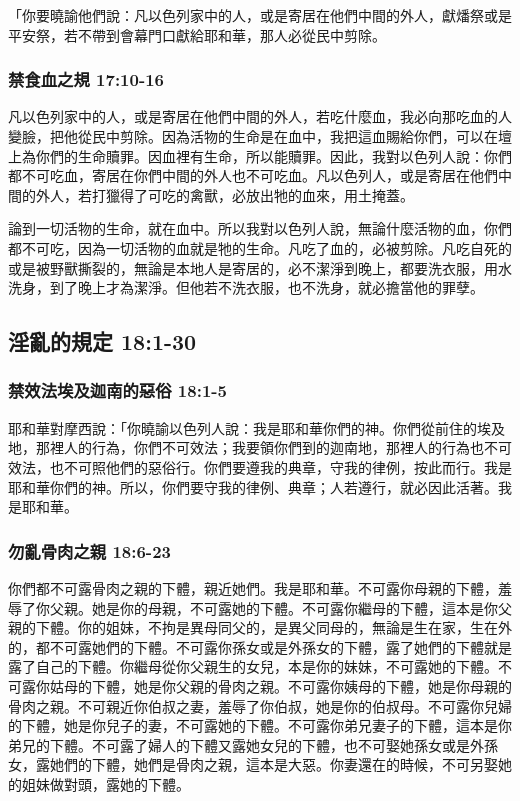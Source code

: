 「你要曉諭他們說：凡以色列家中的人，或是寄居在他們中間的外人，獻燔祭或是平安祭，若不帶到會幕門口獻給耶和華，那人必從民中剪除。

\subsubsection{禁食血之規 17:10-16}
凡以色列家中的人，或是寄居在他們中間的外人，若吃什麼血，我必向那吃血的人變臉，把他從民中剪除。因為活物的生命是在血中，我把這血賜給你們，可以在壇上為你們的生命贖罪。因血裡有生命，所以能贖罪。因此，我對以色列人說：你們都不可吃血，寄居在你們中間的外人也不可吃血。凡以色列人，或是寄居在他們中間的外人，若打獵得了可吃的禽獸，必放出牠的血來，用土掩蓋。

論到一切活物的生命，就在血中。所以我對以色列人說，無論什麼活物的血，你們都不可吃，因為一切活物的血就是牠的生命。凡吃了血的，必被剪除。凡吃自死的或是被野獸撕裂的，無論是本地人是寄居的，必不潔淨到晚上，都要洗衣服，用水洗身，到了晚上才為潔淨。但他若不洗衣服，也不洗身，就必擔當他的罪孽。

\subsection{淫亂的規定 18:1-30}
\subsubsection{禁效法埃及迦南的惡俗 18:1-5}
耶和華對摩西說：「你曉諭以色列人說：我是耶和華你們的神。你們從前住的埃及地，那裡人的行為，你們不可效法；我要領你們到的迦南地，那裡人的行為也不可效法，也不可照他們的惡俗行。你們要遵我的典章，守我的律例，按此而行。我是耶和華你們的神。所以，你們要守我的律例、典章；人若遵行，就必因此活著。我是耶和華。

\subsubsection{勿亂骨肉之親 18:6-23}
你們都不可露骨肉之親的下體，親近她們。我是耶和華。不可露你母親的下體，羞辱了你父親。她是你的母親，不可露她的下體。不可露你繼母的下體，這本是你父親的下體。你的姐妹，不拘是異母同父的，是異父同母的，無論是生在家，生在外的，都不可露她們的下體。不可露你孫女或是外孫女的下體，露了她們的下體就是露了自己的下體。你繼母從你父親生的女兒，本是你的妹妹，不可露她的下體。不可露你姑母的下體，她是你父親的骨肉之親。不可露你姨母的下體，她是你母親的骨肉之親。不可親近你伯叔之妻，羞辱了你伯叔，她是你的伯叔母。不可露你兒婦的下體，她是你兒子的妻，不可露她的下體。不可露你弟兄妻子的下體，這本是你弟兄的下體。不可露了婦人的下體又露她女兒的下體，也不可娶她孫女或是外孫女，露她們的下體，她們是骨肉之親，這本是大惡。你妻還在的時候，不可另娶她的姐妹做對頭，露她的下體。

